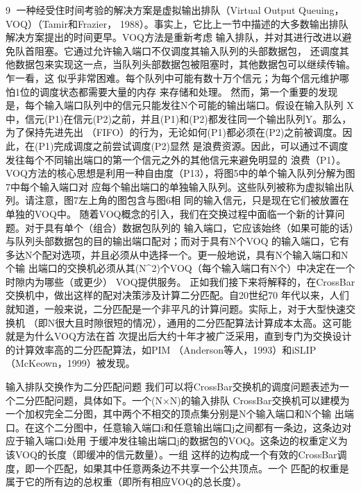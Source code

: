                                                      9
一种经受住时间考验的解决方案是虚拟输出排队（Virtual Output Queuing，VOQ）（Tamir和Frazier，
1988）。事实上，它比上一节中描述的大多数输出排队解决方案提出的时间更早。VOQ方法是重新考虑
输入排队，并对其进行改进以避免队首阻塞。它通过允许输入端口不仅调度其输入队列的头部数据包，
还调度其他数据包来实现这一点，当队列头部数据包被阻塞时，其他数据包可以继续传输。乍一看，这
似乎非常困难。每个队列中可能有数十万个信元；为每个信元维护哪怕1位的调度状态都需要大量的内存
来存储和处理。
然而，第一个重要的发现是，每个输入端口队列中的信元只能发往N个可能的输出端口。假设在输入队列
X中，信元(P1)在信元(P2)之前，并且(P1)和(P2)都发往同一个输出队列Y。那么，为了保持先进先出
（FIFO）的行为，无论如何(P1)都必须在(P2)之前被调度。因此，在(P1)完成调度之前尝试调度(P2)显然
是浪费资源。因此，可以通过不调度发往每个不同输出端口的第一个信元之外的其他信元来避免明显的
浪费（P1）。
VOQ方法的核心思想是利用一种自由度（P13），将图5中的单个输入队列分解为图7中每个输入端口对
应每个输出端口的单独输入队列。这些队列被称为虚拟输出队列。请注意，图7左上角的图包含与图6相
同的输入信元，只是现在它们被放置在单独的VOQ中。
随着VOQ概念的引入，我们在交换过程中面临一个新的计算问题。对于具有单个（组合）数据包队列的
输入端口，它应该始终（如果可能的话）与队列头部数据包的目的输出端口配对；而对于具有N个VOQ
的输入端口，它有多达N个配对选项，并且必须从中选择一个。更一般地说，具有N个输入端口和N个输
出端口的交换机必须从其(N^2)个VOQ（每个输入端口有N个）中决定在一个时隙内为哪些（或更少）
VOQ提供服务。
正如我们接下来将解释的，在CrossBar交换机中，做出这样的配对决策涉及计算二分匹配。自20世纪70
年代以来，人们就知道，一般来说，二分匹配是一个非平凡的计算问题。实际上，对于大型快速交换机
（即N很大且时隙很短的情况），通用的二分匹配算法计算成本太高。这可能就是为什么VOQ方法在首
次提出后大约十年才被广泛采用，直到专门为交换设计的计算效率高的二分匹配算法，如PIM
（Anderson等人，1993）和iSLIP（McKeown，1999）被发现。

输入排队交换作为二分匹配问题
我们可以将CrossBar交换机的调度问题表述为一个二分匹配问题，具体如下。一个(N×N)的输入排队
CrossBar交换机可以建模为一个加权完全二分图，其中两个不相交的顶点集分别是N个输入端口和N个输
出端口。在这个二分图中，任意输入端口i和任意输出端口j之间都有一条边，这条边对应于输入端口i处用
于缓冲发往输出端口j的数据包的VOQ。这条边的权重定义为该VOQ的长度（即缓冲的信元数量）。一组
这样的边构成一个有效的CrossBar调度，即一个匹配，如果其中任意两条边不共享一个公共顶点。一个
匹配的权重是属于它的所有边的总权重（即所有相应VOQ的总长度）。


